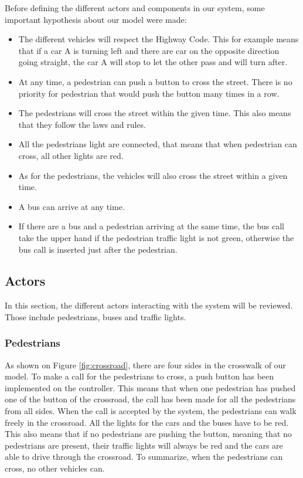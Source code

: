 Before defining the different actors and components in our system, some important hypothesis about our model were made:
\begin{itemize}
    \item The different vehicles will respect the Highway Code. This for example means that if a car A is turning left and there are car on the opposite direction going straight, the car A will stop to let the other pass and will turn after.
    \item At any time, a pedestrian can push a button to cross the street. There is no priority for pedestrian that would push the button many times in a row.
    \item The pedestrians will cross the street within the given time. This also means that they follow the laws and rules.
    \item All the pedestrians light are connected, that means that when pedestrian can cross, all other lights are red.
    \item As for the pedestrians, the vehicles will also cross the street within a given time.
    \item A bus can arrive at any time.
    \item If there are a bus and a pedestrian arriving at the same time, the bus call take the upper hand if the pedestrian traffic light is not green, otherwise the bus call is inserted just after the pedestrian.
\end{itemize}

\subsection{Actors}
In this section, the different actors interacting with the system will be reviewed. Those include pedestrians, buses and traffic lights.

\subsubsection{Pedestrians}
As shown on Figure \ref{fig:crossroad}, there are four sides in the crosswalk of our model. To make a call for the pedestrians to cross, a push button has been implemented on the controller. This means that when one pedestrian has pushed one of the button of the crossroad, the call has been made for all the pedestrians from all  sides. When the call is accepted by the system, the pedestrians can walk freely in the crossroad. All the lights for the cars and the buses have to be red. This also means that if no pedestrians are pushing the button, meaning that no pedestrians are present, their traffic lights will always be red and the cars are able to drive through the crossroad.
To summarize, when the pedestrians can cross, no other vehicles can. 


